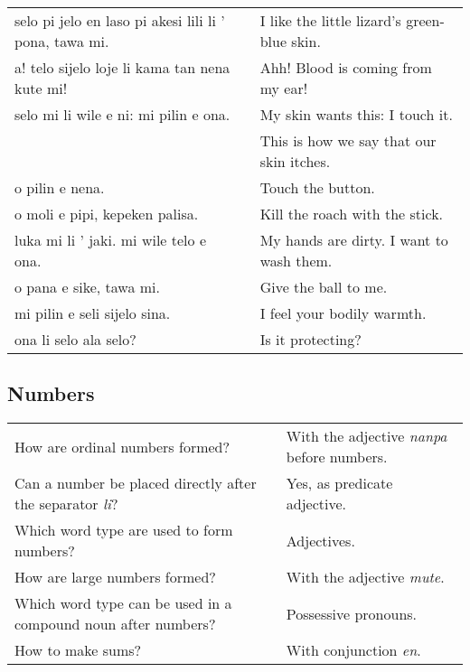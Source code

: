 \begin{supertabular}{p{5,5cm}|ll}
selo pi jelo en laso pi akesi lili li ' pona, tawa mi. && I like the little lizard's green-blue skin. \\ %
a! telo sijelo loje li kama tan nena kute mi!  && Ahh! Blood is coming from my ear! \\
selo mi li wile e ni: mi pilin e ona.  && My skin wants this: I touch it. \\
   && This is how we say that our skin itches. \\  %
o pilin e nena.  && Touch the button. \\
o moli e pipi, kepeken palisa.  && Kill the roach with the stick. \\
luka mi li ' jaki. mi wile telo e ona.  && My hands are dirty. I want to wash them. \\
o pana e sike, tawa mi.  && Give the ball to me. \\
mi pilin e seli sijelo sina.  && I feel your bodily warmth. \\
ona li selo ala selo? && Is it protecting? \\ 
\end{supertabular} 


\newpage
%
\subsection*{Numbers} 
\label{'numbers'}
%
\begin{supertabular}{p{5,5cm}|ll}
How are ordinal numbers formed? && With the adjective \textit{nanpa} before numbers.  \\ %
Can a number be placed directly after the separator \textit{li}? && Yes, as predicate adjective.  \\ %
Which word type are used to form numbers? && Adjectives. \\ %
How are large numbers formed? && With the adjective \textit{mute}. \\ %
Which word type can be used in a compound noun after numbers? && Possessive pronouns. \\ %
How to make sums? && With conjunction \textit{en}. \\ %
\end{supertabular} 

